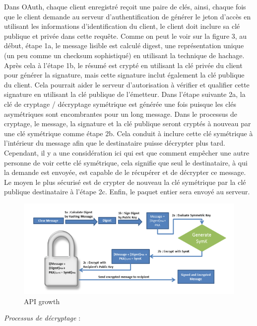 \begin{itemize}
Dans OAuth, chaque client enregistré reçoit une paire de clés, ainsi, chaque fois que le client demande au serveur d'authentification de générer le jeton d'accès en utilisant les informations d'identification du client, le client doit inclure sa clé publique et privée dans cette requête. Comme on peut le voir sur la figure 3, au début, étape 1a, le message lisible est calculé digest, une représentation unique (un peu comme un checksum sophistiqué) en utilisant la technique de hachage. Après cela à l'étape 1b, le résumé est crypté en utilisant la clé privée du client pour générer la signature, mais cette signature inclut également la clé publique du client. Cela pourrait aider le serveur d'autorisation à vérifier et qualifier cette signature en utilisant la clé publique de l'émetteur. Dans l'étape suivante 2a, la clé de cryptage / décryptage symétrique est générée une fois puisque les clés asymétriques sont encombrantes pour un long message.
Dans le processus de cryptage, le message, la signature et la clé publique seront cryptés à nouveau par une clé symétrique comme étape 2b. Cela conduit à inclure cette clé symétrique à l'intérieur du message afin que le destinataire puisse décrypter plus tard. Cependant, il y a une considération ici qui est que comment empêcher une autre personne de voir cette clé symétrique, cela signifie que seul le destinataire, à qui la demande est envoyée, est capable de le récupérer et de décrypter ce message. Le moyen le plus sécurisé est de crypter de nouveau la clé symétrique par la clé publique destinataire à l'étape 2c. Enfin, le paquet entier sera envoyé au serveur.
\begin{figure}[! ht ]
			\centering
			\includegraphics[scale=.4]{./images/api_encryption_detail.png}
			\caption {API growth}
		\end{figure}
\newpage		

\textit{Processus de décryptage} :


\end{itemize}
